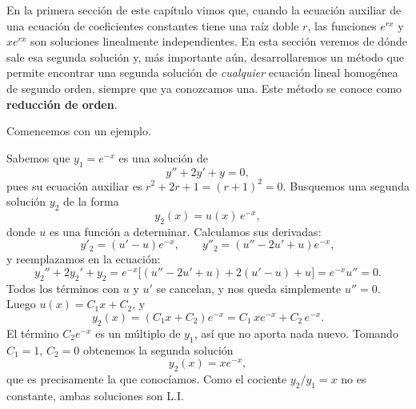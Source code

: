 En la primera secci\'on de este cap\'itulo vimos que, cuando la ecuaci\'on auxiliar de una ecuaci\'on de coeficientes constantes tiene una ra\'iz doble $r$, las funciones $e^{rx}$ y $xe^{rx}$ son soluciones linealmente independientes. En esta secci\'on veremos de d\'onde sale esa segunda soluci\'on y, m\'as importante a\'un, desarrollaremos un m\'etodo que permite encontrar una segunda soluci\'on de \emph{cualquier} ecuaci\'on lineal homog\'enea de segundo orden, siempre que ya conozcamos una. Este m\'etodo se conoce como \textbf{reducci\'on de orden}.

Comencemos con un ejemplo.

\begin{example}
    Sabemos que $y_1=e^{-x}$ es una soluci\'on de
    \[
    y''+2y'+y=0,
    \]
    pues su ecuaci\'on auxiliar es $r^2+2r+1=(r+1)^2=0$. Busquemos una segunda soluci\'on $y_2$ de la forma
    \[
    y_2(x)=u(x)\,e^{-x},
    \]
    donde $u$ es una funci\'on a determinar. Calculamos sus derivadas:
    \[
    y'_2=\left(u'-u\right)e^{-x},\qquad y''_2=\left(u''-2u'+u\right)e^{-x},
    \]
    y reemplazamos en la ecuaci\'on:
    \[
    y_2''+2y_2'+y_2=e^{-x}\Big[\left(u''-2u'+u\right)+2\left(u'-u\right)+u\Big]=e^{-x}u''=0.
    \]
    Todos los t\'erminos con $u$ y $u'$ se cancelan, y nos queda simplemente $u''=0$. Luego $u(x)=C_1x+C_2$, y
    \[
    y_2(x)=\left(C_1x+C_2\right)e^{-x}=C_1\,xe^{-x}+C_2\,e^{-x}.
    \]
    El t\'ermino $C_2e^{-x}$ es un m\'ultiplo de $y_1$, as\'i que no aporta nada nuevo. Tomando $C_1=1$, $C_2=0$ obtenemos la segunda soluci\'on
    \[
    y_2(x)=xe^{-x},
    \]
    que es precisamente la que conoc\'iamos. Como el cociente $y_2/y_1=x$ no es constante, ambas soluciones son L.I.
\end{example}

